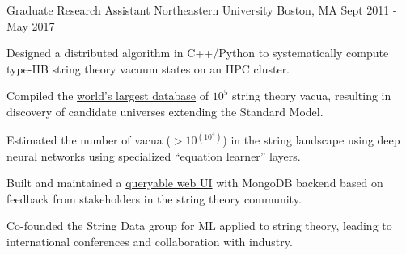 \begin{cventries}
  \cventry
    {Graduate Research Assistant} %
    {Northeastern University} %
    {Boston, MA} %
    {Sept 2011 - May 2017} %
    {
      \begin{cvitems} %
        \item {Designed a distributed algorithm in C++/Python to systematically compute type-IIB string theory vacuum states on an HPC cluster.}
        \item {Compiled the \href{https://app.box.com/s/ch4w5gy1wv9dv11ptf314u7ovj2x4vig}{world's largest database} of $10^5$ string theory vacua, resulting in discovery of candidate universes extending the Standard Model.} %
        \item {Estimated the number of vacua ($>10^{(10^{4})}$) in the string landscape using deep neural networks using specialized ``equation learner'' layers.}
        \item {Built and maintained a \href{http://www.rossealtman.com/toriccy/}{queryable web UI} with MongoDB backend based on feedback from stakeholders in the string theory community.}
        \item {Co-founded the String Data group for ML applied to string theory, leading to international conferences and collaboration with industry.}
      \end{cvitems}
    }


\end{cventries}
